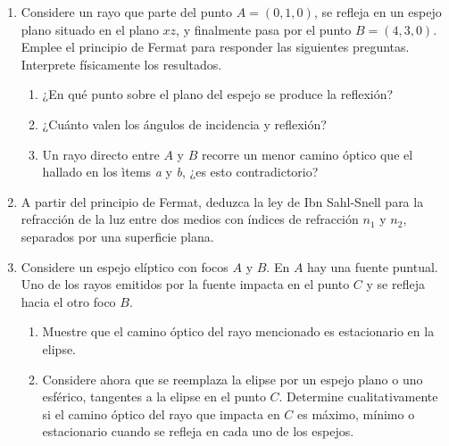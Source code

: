 \documentclass[11pt,spanish]{article}
\begin{document}
\begin{enumerate}

\section*{Principio de Fermat}


    \item Considere un rayo que parte del punto $A=(0,1,0)$, se refleja en un
    espejo plano situado en el plano $xz$, y finalmente pasa por el punto
    $B=(4,3,0)$. Emplee el principio de Fermat para responder las siguientes
    preguntas. Interprete físicamente los resultados.
    \begin{enumerate}
        \item ¿En qué punto sobre el plano del espejo se produce la reflexión?
        \item ¿Cuánto valen los ángulos de incidencia y reflexión?
        \item Un rayo directo entre $A$ y $B$ recorre un menor camino óptico que
        el hallado en los ìtems \textit{a} y \textit{b}, ¿es esto contradictorio?
    \end{enumerate}


    \item A partir del principio de Fermat, deduzca la ley de Ibn Sahl-Snell
    para la refracción de la luz entre dos medios con índices de refracción
    $n_{1}$ y $n_{2}$, separados por una superficie plana.


    \item Considere un espejo elíptico con focos $A$ y $B$. En $A$ hay una
    fuente puntual. Uno de los rayos emitidos por la fuente impacta en el punto
    $C$ y se refleja hacia el otro foco $B$.
    
    \begin{enumerate}
        \item Muestre que el camino óptico del rayo mencionado es estacionario
        en la elipse.
        
        \item Considere ahora que se reemplaza la elipse por un espejo plano o
        uno esférico, tangentes a la elipse en el punto $C$. Determine
        cualitativamente si el camino óptico del rayo que impacta en $C$ es
        máximo, mínimo o estacionario cuando se refleja en cada uno de los
        espejos.
    \end{enumerate}


\end{enumerate}
\end{document}
